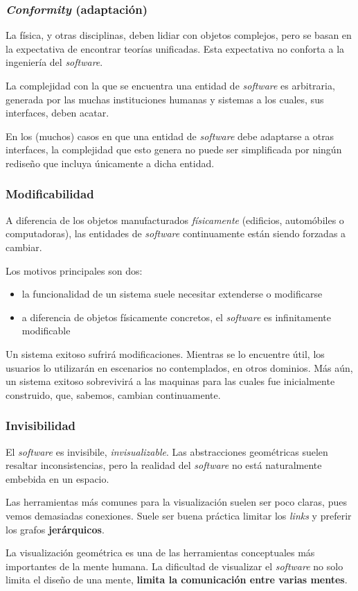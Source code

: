 \documentclass{beamer}
\begin{document}
\begin{frame}[fragile]
  \frametitle{\textit{Conformity} (adaptaci\'on)}

  La f\'isica, y otras disciplinas, deben lidiar con objetos complejos, pero
  se basan en la expectativa de encontrar teor\'ias unificadas.
  Esta expectativa no conforta a la ingenier\'ia del \textit{software}.

  La complejidad con la que se encuentra una entidad de \textit{software}
  es arbitraria, generada por las muchas instituciones humanas y sistemas
  a los cuales, sus interfaces, deben acatar.

  En los (muchos) casos en que una entidad de \textit{software} debe adaptarse
  a otras interfaces, la complejidad que esto genera no puede ser simplificada
  por ning\'un redise\~no que incluya \'unicamente a dicha entidad.
\end{frame}


\begin{frame}[fragile]
  \frametitle{Modificabilidad}
  A diferencia de los objetos manufacturados \textit{f\'isicamente} (edificios,
  autom\'obiles o computadoras), las entidades de \textit{software} continuamente
  est\'an siendo forzadas a cambiar.

  Los motivos principales son dos:
  \begin{itemize}
    \item la funcionalidad de un sistema suele necesitar extenderse o modificarse
    \item a diferencia de objetos f\'isicamente concretos, el \textit{software}
      es infinitamente modificable
  \end{itemize}

  Un sistema exitoso sufrir\'a modificaciones. Mientras se lo encuentre \'util,
  los usuarios lo utilizar\'an en escenarios no contemplados, en otros dominios.
  M\'as a\'un, un sistema exitoso sobrevivir\'a a las maquinas para las cuales
  fue inicialmente construido, que, sabemos, cambian continuamente.
\end{frame}


\begin{frame}[fragile]
  \frametitle{Invisibilidad}
  El \textit{software} es invisibile, \textit{invisualizable}.
  Las abstracciones geom\'etricas suelen resaltar inconsistencias, pero
  la realidad del \textit{software} no est\'a naturalmente embebida
  en un espacio.

  Las herramientas m\'as comunes para la visualizaci\'on suelen ser poco claras,
  pues vemos demasiadas conexiones. Suele ser buena pr\'actica limitar los
  \textit{links} y preferir los grafos \textbf{jer\'arquicos}.

  La visualizaci\'on geom\'etrica es una de las herramientas conceptuales m\'as
  importantes de la mente humana. La dificultad de visualizar el \textit{software}
  no solo limita el dise\~no de una mente, \textbf{limita la comunicaci\'on entre
  varias mentes}.
\end{frame}
\end{document}
